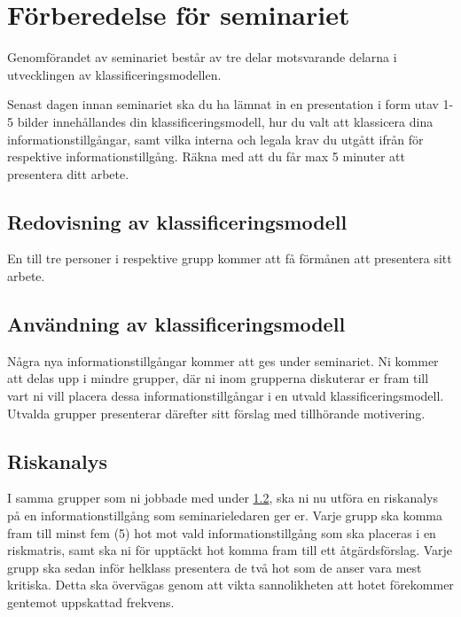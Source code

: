 \documentclass[a4paper]{llncs}
\begin{document}
\section{Förberedelse för seminariet}

Genomförandet av seminariet består av tre delar motsvarande delarna 
i utvecklingen av klassificeringsmodellen.

Senast dagen innan seminariet ska du ha lämnat in en presentation i
form utav 1-5 bilder innehållandes din klassificeringsmodell, hur du valt
att klassicera dina informationstillgångar, samt vilka interna och legala krav
du utgått ifrån för respektive informationstillgång. Räkna med att du får max 5
minuter att presentera ditt arbete.

\subsection{Redovisning av klassificeringsmodell}
\label{sec:present}

En till tre personer i respektive grupp kommer att få förmånen att presentera 
sitt arbete.

\subsection{Användning av klassificeringsmodell}
\label{sec:use}

Några nya informationstillgångar kommer att ges under seminariet.
Ni kommer att delas upp i mindre grupper, där ni inom grupperna diskuterar er 
fram till vart ni vill placera dessa informationstillgångar i en utvald 
klassificeringsmodell.
Utvalda grupper presenterar därefter sitt förslag med tillhörande motivering.

\subsection{Riskanalys}
\label{sec:risk}

I samma grupper som ni jobbade med under \cref{sec:use}, ska ni nu utföra en 
riskanalys på en informationstillgång som seminarieledaren ger er.
Varje grupp ska komma fram till minst fem (5) hot mot vald 
informationstillgång som ska placeras i en riskmatris, samt ska ni för upptäckt
hot komma fram till ett åtgärdsförslag. Varje grupp ska sedan inför helklass presentera
de två hot som de anser vara mest kritiska. Detta ska övervägas genom att vikta sannolikheten
att hotet förekommer gentemot uppskattad frekvens.
\end{document}
